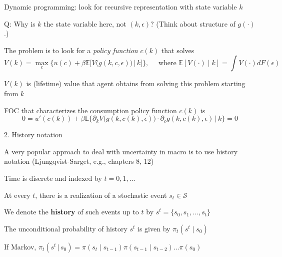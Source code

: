 \documentclass[11pt, aspectratio=169]{beamer}
\newenvironment{witemize}{\itemize\addtolength{\itemsep}{10pt}}{\enditemize}
\begin{document}
\begin{frame}{}
\begin{witemize}
\item Dynamic programming: look for recursive representation with state variable $k$

\item Q: Why is $k$ the state variable here, not $(k, \epsilon)$? (Think about structure of $g(\cdot)$.)

\item The problem is to look for a \textit{policy function} $c(k)$ that solves 
\begin{equation*}
	V(k) = \max_{c} \bigg\{ u(c) + \beta \mathbb E \bigg[ V\Big( g(k, c, \epsilon) \Big) \, \Big| \, k \bigg] \bigg\}  ,
	\quad \text{ where }
	\mathbb E[V(\cdot) \mid k] = \int V(\cdot) dF(\epsilon)
\end{equation*}

\item $V(k)$ is (lifetime) value that agent obtains from solving this problem starting from $k$

\item FOC that characterizes the consumption policy function $c(k)$ is 
\begin{equation*}
	0 = u'(c(k)) + \beta \mathbb E \Big\{ \partial_k V \Big( g(k, c(k), \epsilon) \Big) \cdot \partial_c g(k, c(k), \epsilon) \, \Big| \, k \Big\} = 0
\end{equation*}
\end{witemize}
\end{frame}



\begin{frame}{2. History notation}
\begin{witemize}
\item A very popular approach to deal with uncertainty in macro is to use history notation (Ljungqvist-Sarget, e.g., chapters 8, 12)

\item Time is discrete and indexed by $t = 0, 1, \ldots$

\item At every $t$, there is a realization of a stochastic event $s_t \in \mathcal S$

\item We denote the \textbf{history} of such events up to $t$ by $s^t = \{s_0, s_1, \ldots, s_t\}$

\item The unconditional probability of history $s^t$ is given by $\pi_t(s^t \mid s_0)$

\item If Markov, $\pi_t( s^t \, | \, s_0) = \pi(s_t \mid s_{t-1}) \pi(s_{t-1} \mid s_{t-2}) \ldots \pi(s_0)$

\end{witemize}
\end{frame}
\end{document}
